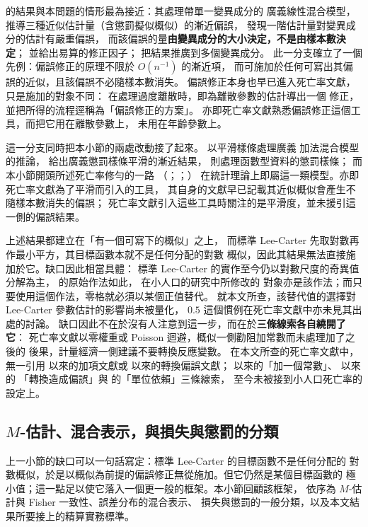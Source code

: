 \documentclass[UTF8, fontset=macnew, a4paper, 12pt]{ctexart}
\begin{document}
\citet{breslow1995} 的結果與本問題的情形最為接近：其處理帶單一變異成分的
廣義線性混合模型，推導三種近似估計量（含懲罰擬似概似）的漸近偏誤，
發現一階估計量對變異成分的估計有嚴重偏誤，
而該偏誤的量\textbf{由變異成分的大小決定，不是由樣本數決定}；
並給出易算的修正因子；\citet{linbreslow1996} 把結果推廣到多個變異成分。
此一分支確立了一個先例：偏誤修正的原理不限於 $O(n^{-1})$ 的漸近項，
而可施加於任何可寫出其偏誤的近似，且該偏誤不必隨樣本數消失。
偏誤修正本身也早已進入死亡率文獻，只是施加的對象不同：
\citet[\S4]{djeundje2010} 在處理過度離散時，即為離散參數的估計導出一個
修正，並把所得的流程逕稱為「偏誤修正的方案」。
亦即死亡率文獻熟悉偏誤修正這個工具，而把它用在離散參數上，
未用在年齡參數上。

這一分支同時把本小節的兩處改動接了起來。\citet{lin1999} 以平滑樣條處理廣義
加法混合模型的推論，\citet{kauermann2009} 給出廣義懲罰樣條平滑的漸近結果，
\citet{xiao2020} 則處理函數型資料的懲罰樣條；
而本小節開頭所述死亡率修勻的一路
（\citealp{currie2004}；\citealp{delwarde2007}；\citealp{currie2013}）
在統計理論上即屬這一類模型。亦即死亡率文獻為了平滑而引入的工具，
其自身的文獻早已記載其近似概似會產生不隨樣本數消失的偏誤；
死亡率文獻引入這些工具時關注的是平滑度，並未援引這一側的偏誤結果。

上述結果都建立在「有一個可寫下的概似」之上，
而標準 Lee-Carter 先取對數再作最小平方，其目標函數本就不是任何分配的對數
概似，因此其結果無法直接施加於它。缺口因此相當具體：
標準 Lee-Carter 的實作至今仍以對數尺度的奇異值分解為主，
\citet{lee1992} 的原始作法如此，\citet{yue2019} 在小人口的研究中所修改的
對象亦是該作法；而只要使用這個作法，零格就必須以某個正值替代。
就本文所查，該替代值的選擇對 Lee-Carter 參數估計的影響尚未被量化，
$0.5$ 這個慣例在死亡率文獻中亦未見其出處的討論。
缺口因此不在於沒有人注意到這一步，而在於\textbf{三條線索各自繞開了它}：
死亡率文獻以零權重或 Poisson 迴避，概似一側勸阻加常數而未處理加了之後的
後果，計量經濟一側建議不要轉換反應變數。
在本文所查的死亡率文獻中，無一引用 \citet{haldane1956} 以來的加項文獻或
\citet{duan1983} 以來的轉換偏誤文獻；
\citet{haldane1956} 以來的「加一個常數」、\citet{duan1983} 以來的
「轉換造成偏誤」與 \citet{chenroth2024} 的「單位依賴」三條線索，
至今未被接到小人口死亡率的設定上。

\subsection{$M$-估計、混合表示，與損失與懲罰的分類}\label{subsec:mest}\label{subsec:mix}\label{subsec:mq}\label{subsec:cred}

上一小節的缺口可以一句話寫定：標準 Lee-Carter 的目標函數不是任何分配的
對數概似，於是以概似為前提的偏誤修正無從施加。但它仍然是某個目標函數的
極小值；這一點足以使它落入一個更一般的框架。本小節回顧該框架，
依序為 $M$-估計與 Fisher 一致性、誤差分布的混合表示、
損失與懲罰的一般分類，以及本文結果所要接上的精算實務標準。
\end{document}
